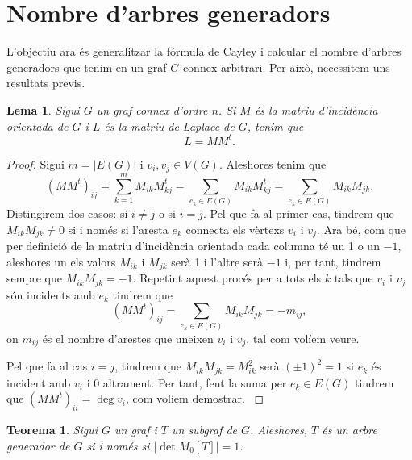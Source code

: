 \documentclass{article}
\newtheorem{theorem}{Teorema}[section]
\newtheorem{lemma}{Lema}[section]
\begin{document}
\section{Nombre d'arbres generadors}
    L'objectiu ara és generalitzar la fórmula de Cayley i calcular el nombre d'arbres generadors que tenim en un graf $G$ connex arbitrari. Per això, necessitem uns resultats previs.
    \begin{lemma}\label{1}
    Sigui $G$ un graf connex d'ordre $n$. Si $M$ és la matriu d'incidència orientada de $G$ i $L$ és la matriu de Laplace de $G$, tenim que $$L=MM^t.$$
    \end{lemma}
    \begin{proof}
    Sigui $m=|E(G)|$ i $v_i,v_j\in V(G)$. Aleshores tenim que $$(MM^t)_{ij}=\sum_{k=1}^mM_{ik}M_{kj}^t=\sum_{e_k\in E(G)}M_{ik}M_{kj}^t=\sum_{e_k\in E(G)}M_{ik}M_{jk}.$$
    Distingirem dos casos: si $i\ne j$ o si $i=j$. Pel que fa al primer cas, tindrem que $M_{ik}M_{jk}\ne 0$ si i només si l'aresta $e_k$ connecta els vèrtexs $v_i$ i $v_j$. Ara bé, com que per definició de la matriu d'incidència orientada cada columna té un 1 o un $-1$, aleshores un els valors $M_{ik}$ i $M_{jk}$ serà 1 i l'altre serà $-1$ i, per tant, tindrem sempre que $M_{ik}M_{jk}=-1$. Repetint aquest procés per a tots els $k$ tals que $v_i$ i $v_j$ són incidents amb $e_k$ tindrem que $$(MM^t)_{ij}=\sum_{e_k\in E(G)}M_{ik}M_{jk}=-m_{ij},$$ on $m_{ij}$ és el nombre d'arestes que uneixen $v_i$ i $v_j$, tal com volíem veure.\par
    Pel que fa al cas $i=j$, tindrem que $M_{ik}M_{jk}=M_{ik}^2$ serà $(\pm 1)^2=1$ si $e_k$ és incident amb $v_i$ i 0 altrament. Per tant, fent la suma per $e_k\in E(G)$ tindrem que $(MM^t)_{ii}=\deg v_i$, com volíem demostrar. \cite{2}
    \end{proof}
    \begin{theorem}\label{2}
    Sigui $G$ un graf i $T$ un subgraf de $G$. Aleshores, $T$ és un arbre generador de $G$ si i només si $|\det M_0[T]|=1$.
    \end{theorem}
\end{document}

